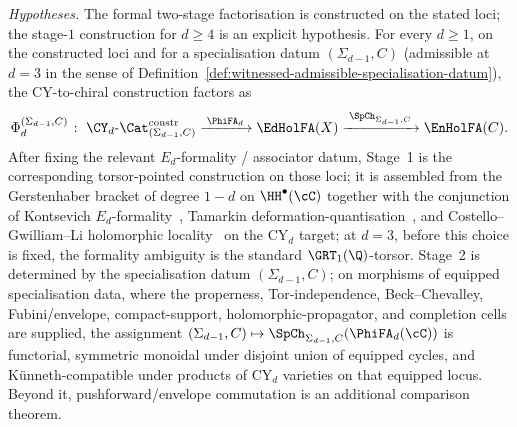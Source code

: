 \begin{theorem}
\label{thm:phi-two-stage-factorisation}
\noindent\emph{Hypotheses.} The formal two-stage factorisation is constructed on the stated loci; the stage-$1$ construction for \(d\geq4\) is an explicit hypothesis.
For every $d \geq 1$, on the constructed loci and for a specialisation
datum $(\Sigma_{d-1}, C)$ \textup{(}admissible at $d=3$ in
the sense of
Definition~\ref{def:witnessed-admissible-specialisation-datum}\textup{),}
the CY-to-chiral construction
factors as
 \[
 \Phi_d^{(\Sigma_{d-1}, C)} \;\colon\;
 \CY_d\text{-}\Cat^{\mathrm{constr}}_{(\Sigma_{d-1},C)}
 \xrightarrow{\;\PhiFA_d\;}
 \EdHolFA(X)
 \xrightarrow{\;\SpCh_{\Sigma_{d-1}, C}\;}
 \EnHolFA(C).
\]
After fixing the relevant $E_d$-formality / associator datum, Stage~1
is the corresponding torsor-pointed construction on those loci; it is
assembled from the Gerstenhaber bracket of degree $1 - d$ on $\HH^\bullet(\cC)$ together with the
conjunction of Kontsevich $E_d$-formality~\cite{Kontsevich1999},
Tamarkin deformation-quantisation~\cite{Tamarkin2007}, and
Costello--Gwilliam--Li holomorphic
locality~\cite{CostelloGwilliam2017,CostelloLi2016,CostelloLi2020} on
the CY$_d$ target; at $d=3$, before this choice is fixed, the
formality ambiguity is the standard $\GRT_1(\Q)$-torsor. Stage~2 is
determined by the specialisation datum
$(\Sigma_{d-1}, C)$; on morphisms of equipped specialisation data,
where the properness, Tor-independence, Beck--Chevalley,
Fubini/envelope, compact-support, holomorphic-propagator, and
completion cells are supplied, the assignment
$(\Sigma_{d-1}, C) \mapsto \SpCh_{\Sigma_{d-1}, C}(\PhiFA_d(\cC))$ is
functorial, symmetric monoidal under disjoint union of equipped cycles,
and Künneth-compatible under products of CY$_d$ varieties on that
equipped locus. Beyond it, pushforward/envelope commutation is an
additional comparison theorem.
\end{theorem}

